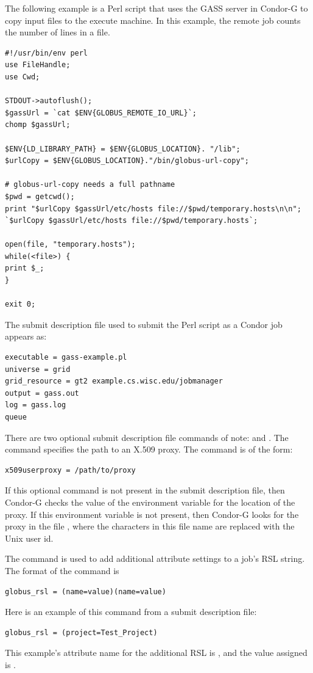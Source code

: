 The following example is a Perl script that uses the GASS server in Condor-G
to copy input files to the execute machine.
In this example, the remote job
counts the number of lines in a file.

\footnotesize
\begin{verbatim}
#!/usr/bin/env perl
use FileHandle;
use Cwd;

STDOUT->autoflush();
$gassUrl = `cat $ENV{GLOBUS_REMOTE_IO_URL}`;
chomp $gassUrl;

$ENV{LD_LIBRARY_PATH} = $ENV{GLOBUS_LOCATION}. "/lib";
$urlCopy = $ENV{GLOBUS_LOCATION}."/bin/globus-url-copy";

# globus-url-copy needs a full pathname
$pwd = getcwd();
print "$urlCopy $gassUrl/etc/hosts file://$pwd/temporary.hosts\n\n";
`$urlCopy $gassUrl/etc/hosts file://$pwd/temporary.hosts`;

open(file, "temporary.hosts");
while(<file>) {
print $_;
}

exit 0;
\end{verbatim}
\normalsize

The submit description file used to submit the Perl script as
a Condor job appears as:

\footnotesize
\begin{verbatim}
executable = gass-example.pl
universe = grid
grid_resource = gt2 example.cs.wisc.edu/jobmanager
output = gass.out
log = gass.log
queue
\end{verbatim}
\normalsize

There are two optional submit description file commands
of note:
 and
.
The  command specifies the path to
an X.509 proxy.
The command is of the form:
\begin{verbatim}
x509userproxy = /path/to/proxy
\end{verbatim}
If this optional command is not present in the submit description file,
then Condor-G checks the value of the environment variable
 for the location of the proxy.
If this environment variable is not present, then Condor-G
looks for the proxy in the file
,
where the characters \verb@XXXX@ in this file name are
replaced with the Unix user id.

The  command is used to add additional
attribute settings to a job's RSL string.
The format of the  command is
\begin{verbatim}
globus_rsl = (name=value)(name=value)
\end{verbatim}
Here is an example of this command from a submit description file:
\begin{verbatim}
globus_rsl = (project=Test_Project)
\end{verbatim}
This example's attribute name for the additional RSL is
, and the value assigned is .

